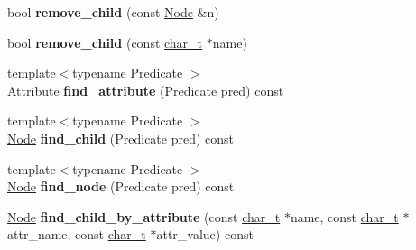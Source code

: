 \begin{DoxyCompactItemize}
\item 
\hypertarget{classphys_1_1xml_1_1Node_a2cf35b26227f6067a25a2ae1647e8f31}{
bool {\bfseries remove\_\-child} (const \hyperlink{classphys_1_1xml_1_1Node}{Node} \&n)}
\label{d7/d0a/classphys_1_1xml_1_1Node_a2cf35b26227f6067a25a2ae1647e8f31}

\item 
\hypertarget{classphys_1_1xml_1_1Node_ab10af5783c31fb58cc533b58a3c11ae0}{
bool {\bfseries remove\_\-child} (const \hyperlink{namespacephys_1_1xml_afc87705cd1c2917d87b879715a2d8f6e}{char\_\-t} $\ast$name)}
\label{d7/d0a/classphys_1_1xml_1_1Node_ab10af5783c31fb58cc533b58a3c11ae0}

\item 
\hypertarget{classphys_1_1xml_1_1Node_a59e43a51c83065e02fea2f39a37d84f0}{
{\footnotesize template$<$typename Predicate $>$ }\\\hyperlink{classphys_1_1xml_1_1Attribute}{Attribute} {\bfseries find\_\-attribute} (Predicate pred) const }
\label{d7/d0a/classphys_1_1xml_1_1Node_a59e43a51c83065e02fea2f39a37d84f0}

\item 
\hypertarget{classphys_1_1xml_1_1Node_aa46f1a55d5fead8ea4cc68235e45f3fc}{
{\footnotesize template$<$typename Predicate $>$ }\\\hyperlink{classphys_1_1xml_1_1Node}{Node} {\bfseries find\_\-child} (Predicate pred) const }
\label{d7/d0a/classphys_1_1xml_1_1Node_aa46f1a55d5fead8ea4cc68235e45f3fc}

\item 
\hypertarget{classphys_1_1xml_1_1Node_af755f4925f6839e0f8a768cfc3b265d4}{
{\footnotesize template$<$typename Predicate $>$ }\\\hyperlink{classphys_1_1xml_1_1Node}{Node} {\bfseries find\_\-node} (Predicate pred) const }
\label{d7/d0a/classphys_1_1xml_1_1Node_af755f4925f6839e0f8a768cfc3b265d4}

\item 
\hypertarget{classphys_1_1xml_1_1Node_ad877293c5bfd97ea7f4e6319db816ac4}{
\hyperlink{classphys_1_1xml_1_1Node}{Node} {\bfseries find\_\-child\_\-by\_\-attribute} (const \hyperlink{namespacephys_1_1xml_afc87705cd1c2917d87b879715a2d8f6e}{char\_\-t} $\ast$name, const \hyperlink{namespacephys_1_1xml_afc87705cd1c2917d87b879715a2d8f6e}{char\_\-t} $\ast$attr\_\-name, const \hyperlink{namespacephys_1_1xml_afc87705cd1c2917d87b879715a2d8f6e}{char\_\-t} $\ast$attr\_\-value) const }
\label{d7/d0a/classphys_1_1xml_1_1Node_ad877293c5bfd97ea7f4e6319db816ac4}


\end{DoxyCompactItemize}
